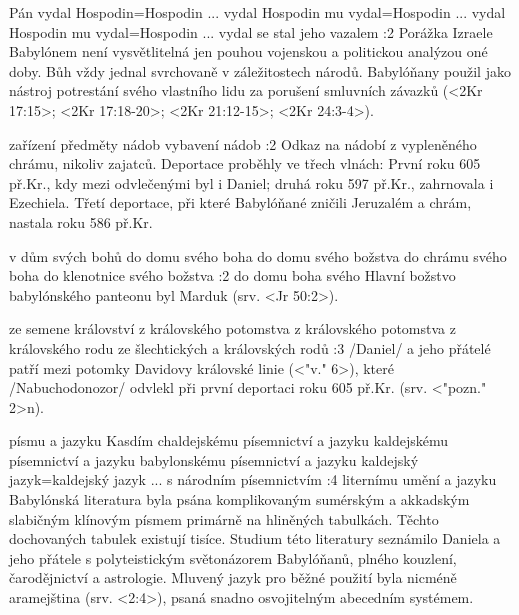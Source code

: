     {Pán vydal} %
    {Hospodin}={Hospodin ... vydal}  %
    {Hospodin mu vydal}={Hospodin ... vydal} %
    {Hospodin mu vydal}={Hospodin ... vydal}  %
    {se stal jeho vazalem}  %
:2 {} Porážka Izraele Babylónem není vysvětlitelná jen pouhou vojenskou a politickou analýzou oné doby. Bůh vždy jednal svrchovaně v záležitostech národů. Babylóňany použil jako nástroj potrestání svého vlastního lidu za porušení smluvních závazků (<2Kr 17:15>; <2Kr 17:18-20>; <2Kr 21:12-15>; <2Kr 24:3-4>).

    {zařízení} %
    {předměty}  %
    {nádob} %
    {vybavení}  %
    {nádob}  %
:2 {} Odkaz na nádobí z vypleněného chrámu, nikoliv zajatců. Deportace proběhly ve třech vlnách: První roku 605 př.Kr., kdy mezi odvlečenými byl i Daniel; druhá roku 597 př.Kr., zahrnovala i Ezechiela. Třetí deportace, při které Babylóňané zničili Jeruzalém a chrám, nastala roku 586 př.Kr.

    {v dům svých bohů} %
    {do domu svého boha}  %
    {do domu svého božstva} %
    {do chrámu svého boha}  %
    {do klenotnice svého božstva}  %
:2 {do domu boha svého}  Hlavní božstvo babylónského panteonu byl Marduk  (srv. <Jr 50:2>).

    {ze semene království} %
    {z královského potomstva}  %
    {z královského potomstva} %
    {z královského rodu}  %
    {ze šlechtických a královských rodů}  %
:3 {} \x/Daniel/ a jeho přátelé patří mezi potomky Davidovy královské linie (<"v." 6>), které \x/Nabuchodonozor/ odvlekl při první deportaci roku 605 př.Kr. (srv. <"pozn." 2>n). 

    {písmu a jazyku Kasdím} %
    {chaldejskému písemnictví a jazyku}  %
    {kaldejskému písemnictví a jazyku} %
    {babylonskému písemnictví a jazyku}  %
    {kaldejský jazyk}={kaldejský jazyk ... s národním písemnictvím}  %
:4 {liternímu umění a jazyku} Babylónská literatura byla psána komplikovaným sumérským a akkadským slabičným klínovým písmem primárně na hliněných tabulkách. Těchto dochovaných tabulek existují tisíce. Studium této literatury seznámilo Daniela a jeho přátele s polyteistickým světonázorem Babylóňanů, plného kouzlení, čarodějnictví a astrologie.  Mluvený jazyk pro běžné použití byla nicméně aramejština (srv. <2:4>), psaná snadno osvojitelným abecedním systémem.

